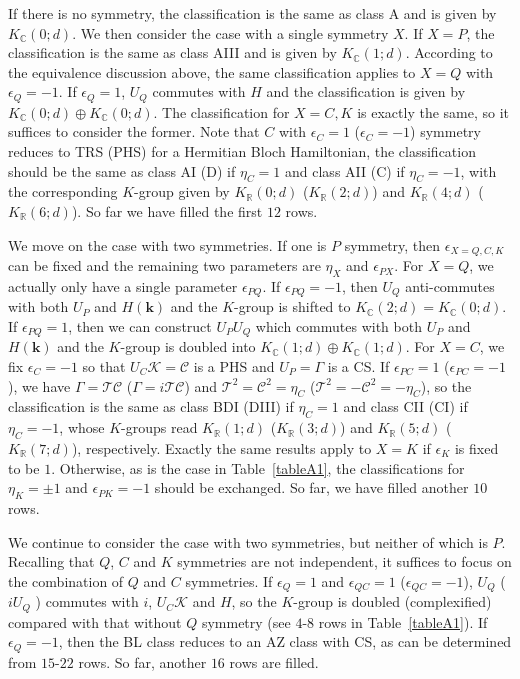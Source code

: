 \documentclass{tADP2e}
\theoremstyle{plain}
\theoremstyle{plain}
\theoremstyle{definition}
\begin{document}
\begin{appendices}
If there is no symmetry, the classification is the same as class A and is given by $K_{\mathbb{C}}(0;d)$. We then consider the case with a single symmetry $X$. If $X=P$, the classification is the same as class AIII and is given by $K_{\mathbb{C}}(1;d)$. According to the equivalence discussion above, the same classification applies to $X=Q$ with $\epsilon_Q=-1$. If $\epsilon_Q=1$, $U_Q$ commutes with $H$ and the classification is given by $K_{\mathbb{C}}(0;d)\oplus K_{\mathbb{C}}(0;d)$. The classification for $X=C,K$ is exactly the same, so it suffices to consider the former. Note that $C$ with $\epsilon_C=1$ ($\epsilon_C=-1$) symmetry reduces to TRS (PHS) for a Hermitian Bloch Hamiltonian, the classification should be the same as class AI (D) if $\eta_C=1$ and class AII (C) if $\eta_C=-1$, with the corresponding $K$-group given by $K_{\mathbb{R}}(0;d)$ ($K_{\mathbb{R}}(2;d)$) and $K_{\mathbb{R}}(4;d)$ ($K_{\mathbb{R}}(6;d)$). So far we have filled the first $12$ rows.

We move on the case with two symmetries. If one is $P$ symmetry, then $\epsilon_{X=Q,C,K}$ can be fixed and the remaining two parameters are $\eta_X$ and $\epsilon_{PX}$. For $X=Q$, we actually only have a single parameter $\epsilon_{PQ}$. If $\epsilon_{PQ}=-1$, then $U_Q$ anti-commutes with both $U_P$ and $H(\boldsymbol{k})$ and the $K$-group is shifted to $K_{\mathbb{C}}(2;d)=K_{\mathbb{C}}(0;d)$. If $\epsilon_{PQ}=1$, then we can construct $U_PU_Q$ which commutes with both $U_P$ and $H(\boldsymbol{k})$ and the $K$-group is doubled into $K_{\mathbb{C}}(1;d)\oplus K_{\mathbb{C}}(1;d)$. For $X=C$, we fix $\epsilon_C=-1$ so that $U_C\mathcal{K}=\mathcal{C}$ is a PHS and $U_P=\Gamma$ is a CS. If $\epsilon_{PC}=1$ ($\epsilon_{PC}=-1$), we have $\Gamma=\mathcal{T}\mathcal{C}$ ($\Gamma=i\mathcal{T}\mathcal{C}$) and $\mathcal{T}^2=\mathcal{C}^2=\eta_C$ ($\mathcal{T}^2=-\mathcal{C}^2=-\eta_C$), so the classification is the same as class BDI (DIII) if $\eta_C=1$ and class CII (CI) if $\eta_C=-1$, whose $K$-groups read $K_{\mathbb{R}}(1;d)$ ($K_{\mathbb{R}}(3;d)$) and $K_{\mathbb{R}}(5;d)$ ($K_{\mathbb{R}}(7;d)$), respectively. Exactly the same results apply to $X=K$ if $\epsilon_K$ is fixed to be $1$. Otherwise, as is the case in Table~\ref{tableA1}, the classifications for $\eta_K=\pm1$ and $\epsilon_{PK}=-1$ should be exchanged. So far, we have filled another $10$ rows.

We continue to consider the case with two symmetries, but neither of which is $P$. Recalling that $Q$, $C$ and $K$ symmetries are not independent, it suffices to focus on the combination of $Q$ and $C$ symmetries. If $\epsilon_Q=1$ and $\epsilon_{QC}=1$ ($\epsilon_{QC}=-1$), $U_Q$ ($iU_Q$ ) commutes with $i$, $U_C\mathcal{K}$ and $H$, %
so the $K$-group is doubled (complexified) compared with that without $Q$ symmetry (see $4$-$8$ rows in Table~\ref{tableA1}). If $\epsilon_Q=-1$, then the BL class reduces to an AZ class with CS, as can be determined from $15$-$22$ rows. So far, another $16$ rows are filled.


\end{appendices}
\end{document}
